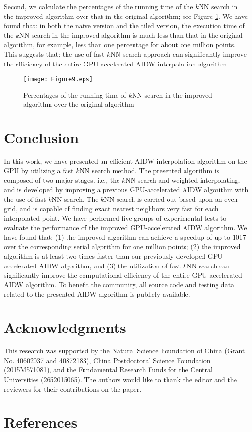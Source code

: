 \documentclass[final,5p,times,twocolumn,authoryear]{elsarticle}
\begin{document}
			Second, we calculate the percentages of the running time of the $k$NN search in 
			the improved algorithm over that in the original algorithm; see Figure \ref{fig9}. We 
			have found that: in both the naive version and the tiled version, the 
			execution time of the $k$NN search in the improved algorithm is much less than 
			that in the original algorithm, for example, less than one percentage for 
			about one million points. This suggests that: the use of fast $k$NN search 
			approach can significantly improve the efficiency of the entire 
			GPU-accelerated AIDW interpolation algorithm. 

\begin{figure}[!h]
				\centering
				\texttt{[image: Figure9.eps]}
				\caption{Percentages of the running time of $k$NN search in the 
					improved algorithm over the original algorithm}
				\label{fig9}
			\end{figure}
						
			\section{Conclusion}
			In this work, we have presented an efficient AIDW interpolation algorithm on 
			the GPU by utilizing a fast $k$NN search method. The presented algorithm is 
			composed of two major stages, i.e., the $k$NN search and weighted 
			interpolating, and is developed by improving a previous GPU-accelerated AIDW 
			algorithm with the use of fast $k$NN search. The $k$NN search is carried out based 
			upon an even grid, and is capable of finding exact nearest neighbors very 
			fast for each interpolated point. We have performed five groups of 
			experimental tests to evaluate the performance of the improved 
			GPU-accelerated AIDW algorithm. We have found that: (1) the improved 
			algorithm can achieve a speedup of up to 1017 over the corresponding serial 
			algorithm for one million points; (2) the improved algorithm is at least two times faster than our 
			previously developed GPU-accelerated AIDW algorithm; and (3) the utilization 
			of fast $k$NN search can significantly improve the computational efficiency of 
			the entire GPU-accelerated AIDW algorithm. To benefit the community, all 
			source code and testing data related to the presented AIDW algorithm is 
			publicly available.

			\section*{Acknowledgments}
			This research was supported by the Natural Science Foundation of China 
			(Grant No. 40602037 and 40872183), China Postdoctoral Science Foundation 
			(2015M571081), and the Fundamental Research Funds for the Central 
			Universities (2652015065). The authors would like to thank the editor and 
			the reviewers for their contributions on the paper. 

\section*{References}
			
   
  
\end{document}
